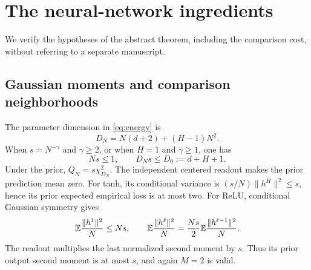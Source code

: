 \section{The neural-network ingredients}
\label{sec:network-ingredients}
We verify the hypotheses of the abstract theorem, including the comparison cost, without referring to a separate manuscript.

\subsection{Gaussian moments and comparison neighborhoods}
The parameter dimension in \eqref{eq:energy} is
\[
 D_N=N(d+2)+(H-1)N^2.
\]
When $s=N^{-\gamma}$ and $\gamma\ge2$, or when $H=1$ and $\gamma\ge1$, one has
\begin{equation}
 Ns\le1,\qquad D_Ns\le D_0:=d+H+1.
 \label{eq:dimension-speed}
\end{equation}
Under the prior, $Q_N=s\chi^2_{D_N}$. The independent centered readout makes the prior prediction mean zero. For tanh, its conditional variance is $(s/N)\|h^H\|^2\le s$, hence its prior expected empirical loss is at most two. For ReLU, conditional Gaussian symmetry gives
\[
 \mathbb E\frac{\|h^1\|^2}N\le Ns,\qquad
 \mathbb E\frac{\|h^\ell\|^2}N=\frac{Ns}{2}\mathbb E\frac{\|h^{\ell-1}\|^2}N.
\]
The readout multiplies the last normalized second moment by $s$. Thus its prior output second moment is at most $s$, and again $M=2$ is valid.

